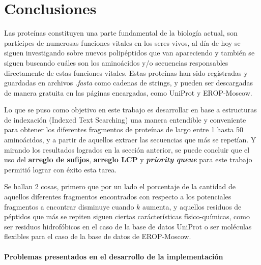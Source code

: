 \chapter*{Conclusiones}


Las proteínas constituyen una parte fundamental de la biología actual, son partícipes de numerosas funciones vitales en los seres vivos, al día de hoy se siguen investigando sobre nuevos polipéptidos que van apareciendo y también se siguen buscando cuáles son los aminoácidos y/o secuencias responsables directamente de estas funciones vitales. Estas proteínas han sido registradas y guardadas en archivos \textit{.fasta} como cadenas de strings, y pueden ser descargadas de manera gratuita en las páginas encargadas, como UniProt y EROP-Moscow.

Lo que se puso como objetivo en este trabajo es desarrollar en base a estructuras de indexación (Indexed Text Searching) una manera entendible y conveniente para obtener los diferentes fragmentos de proteínas de largo entre 1 hasta 50 aminoácidos, y a partir de aquellos extraer las secuencias que más se repetían. Y mirando los resultados logrados en la sección anterior, se puede concluir que el uso del \textbf{arreglo de sufijos}, \textbf{arreglo LCP} y \textbf{\textit{priority queue}} para este trabajo permitió lograr con éxito esta tarea. 

Se hallan 2 cosas, primero que por un lado el porcentaje de la cantidad de aquellos diferentes fragmentos encontrados con respecto a los potenciales fragmentos a encontrar disminuye cuando $k$ aumenta, y aquellos residuos de péptidos que más se repiten siguen ciertas carácterísticas físico-químicas, como ser residuos hidrofóbicos en el caso de la base de datos UniProt o ser moléculas flexibles para el caso de la base de datos de EROP-Moscow.

\subsubsection{Problemas presentados en el desarrollo de la implementación}

